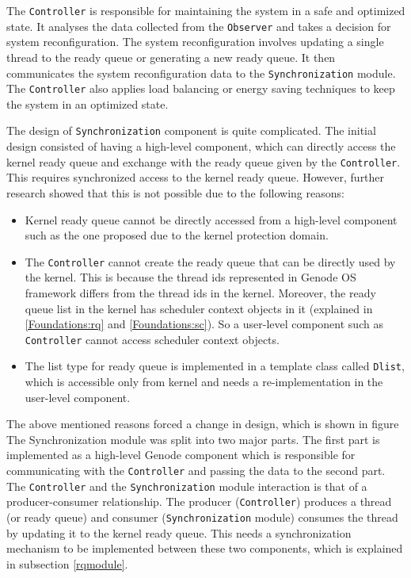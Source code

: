 The \texttt{Controller} is responsible for maintaining the system in a safe and optimized state. It analyses the data collected from the \texttt{Observer} and takes a decision for system reconfiguration\cite{kia4sm}. The system reconfiguration involves updating a single thread to the ready queue or generating a new ready queue. It then communicates the system reconfiguration data to the \texttt{Synchronization} module. The \texttt{Controller} also applies load balancing or energy saving techniques to keep the system in an optimized state.

The design of \texttt{Synchronization} component is quite complicated. The initial design consisted of having a high-level component, which can directly access the kernel ready queue and exchange with the ready queue given by the \texttt{Controller}. This requires synchronized access to the kernel ready queue. However, further research showed that this is not possible due to the following reasons:  

\begin{itemize}
\item Kernel ready queue cannot be directly accessed from a high-level component such as the one proposed due to the kernel protection domain.

\item The \texttt{Controller} cannot create the ready queue that can be directly used by the kernel. This is because the
thread ids represented in Genode OS framework differs from the thread ids in the kernel. Moreover, the ready queue list in the kernel has scheduler context objects in it (explained in \ref{Foundations:rq} and \ref{Foundations:sc}). So a user-level component such as \texttt{Controller} cannot access scheduler context objects.

\item The list type for ready queue is implemented in a template class called \texttt{Dlist}, which is accessible only from kernel and needs a re-implementation in the user-level component.

\end{itemize}

The above mentioned reasons forced a change in design, which is shown in figure %
The Synchronization module was split into two major parts. The first part is implemented as a high-level Genode component which is responsible for communicating with the \texttt{Controller} and passing the data to the second part. The \texttt{Controller} and the \texttt{Synchronization} module interaction is that of a producer-consumer relationship. The producer (\texttt{Controller}) produces a thread (or ready queue) and consumer (\texttt{Synchronization} module) consumes the thread by updating it to the kernel ready queue. This needs a synchronization mechanism to be implemented between these two components, which is explained in subsection \ref{rqmodule}.

